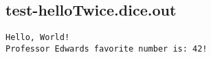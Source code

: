 \subsection{test-helloTwice.dice.out}
\begin{verbatim}
Hello, World!
Professor Edwards favorite number is: 42!

\end{verbatim}